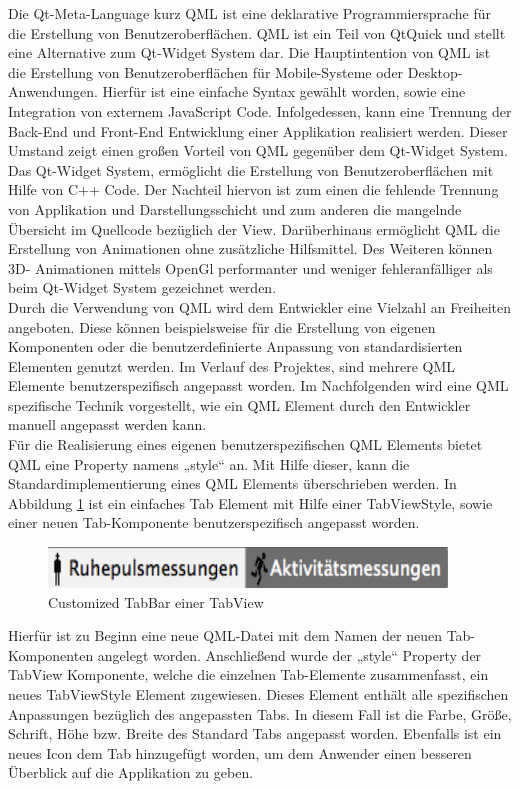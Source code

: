Die Qt-Meta-Language kurz QML ist eine deklarative Programmiersprache für die Erstellung von Benutzeroberflächen. QML ist ein Teil von QtQuick und stellt eine Alternative zum Qt-Widget System dar. Die Hauptintention von QML ist die Erstellung von Benutzeroberflächen für Mobile-Systeme oder Desktop-Anwendungen. Hierfür ist eine einfache Syntax gewählt worden, sowie eine Integration von externem JavaScript Code. Infolgedessen, kann eine Trennung der Back-End und Front-End Entwicklung einer Applikation realisiert werden. Dieser Umstand zeigt einen großen Vorteil von QML gegenüber dem Qt-Widget System. Das Qt-Widget System, ermöglicht die Erstellung von Benutzeroberflächen mit Hilfe von C++ Code. Der Nachteil hiervon ist zum einen die fehlende Trennung von Applikation und Darstellungsschicht und zum anderen die mangelnde Übersicht im Quellcode bezüglich der View. Darüberhinaus ermöglicht QML die Erstellung von Animationen ohne zusätzliche Hilfsmittel. Des Weiteren können 3D- Animationen mittels OpenGl performanter und weniger fehleranfälliger als beim Qt-Widget System gezeichnet werden. \\

Durch die Verwendung von QML wird dem Entwickler eine Vielzahl an Freiheiten angeboten. Diese können beispielsweise für die Erstellung von eigenen Komponenten oder die benutzerdefinierte Anpassung von standardisierten Elementen genutzt werden. Im Verlauf des Projektes, sind mehrere QML Elemente benutzerspezifisch angepasst worden. Im Nachfolgenden wird eine QML spezifische Technik vorgestellt, wie ein QML Element durch den Entwickler manuell angepasst werden kann. \\

Für die Realisierung eines eigenen benutzerspezifischen QML Elements bietet QML  eine Property namens „style“ an. Mit Hilfe dieser, kann die Standardimplementierung eines QML Elements überschrieben werden. In Abbildung \ref{pic:TabView} ist ein einfaches Tab Element mit Hilfe einer TabViewStyle, sowie einer neuen Tab-Komponente benutzerspezifisch angepasst worden.

\begin{figure}[H]
	\centering
	\includegraphics[scale=0.6]{images/TabView.png}
	\caption{Customized TabBar einer TabView}
	\label{pic:TabView}
\end{figure}

Hierfür ist zu Beginn eine neue QML-Datei mit dem Namen der neuen Tab-Komponenten angelegt worden. Anschließend wurde der „style“ Property der TabView Komponente, welche die einzelnen Tab-Elemente zusammenfasst, ein neues TabViewStyle Element zugewiesen. Dieses Element enthält alle spezifischen Anpassungen bezüglich des angepassten Tabs. In diesem Fall ist die Farbe, Größe, Schrift, Höhe bzw. Breite des Standard Tabs angepasst worden. Ebenfalls ist ein neues Icon dem Tab hinzugefügt worden, um dem Anwender einen besseren Überblick auf die Applikation zu geben. \\

